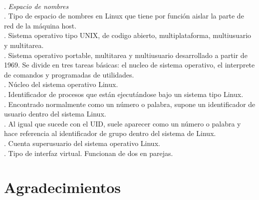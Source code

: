 \documentclass[12pt]{article}
\begin{document}
	\\
		 
	. \textit{Espacio de nombres}\\
		 
	. Tipo de espacio de nombres en Linux que tiene por función aislar la parte de red de la máquina host.\\
	
	. Sistema operativo tipo UNIX, de codigo abierto, multiplataforma, multiusuario y multitarea.\\
	
	. Sistema operativo portable, multitarea y multiusuario desarrollado a partir de 1969. Se divide en tres tareas básicas: el nucleo de sistema operativo, el interprete de comandos y programadas de utilidades.  \\
		 
	. Núcleo del sistema operativo Linux.\\
		 
	. Identificador de procesos que están ejecutándose bajo un sistema tipo Linux.\\
	
	. Encontrado normalmente como un número o palabra, supone un identificador de usuario dentro del sistema Linux.\\
	
	. Al igual que sucede con el UID, suele aparecer como un número o palabra y hace referencia al identificador de grupo dentro del sistema de Linux.\\
		 
	. Cuenta superusuario del sistema operativo Linux.\\
		 
	. Tipo de interfaz virtual. Funcionan de dos en parejas.\\
		 
	
	\pagebreak
	
	\section*{Agradecimientos}
	
\end{document}
